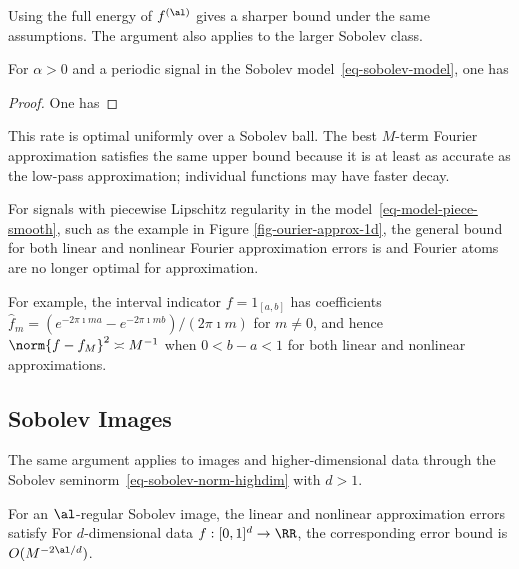 Using the full energy of $f^{(\al)}$ gives a sharper bound under the same assumptions. The argument also applies to the larger Sobolev class.

\begin{prop}\label{prop-sobol-fourier-lin}
	For $\alpha>0$ and a periodic signal in the Sobolev model~\eqref{eq-sobolev-model}, one has
\end{prop}
\begin{proof}
	One has
\end{proof}

This rate is optimal uniformly over a Sobolev ball. The best $M$-term Fourier approximation satisfies the same upper bound because it is at least as accurate as the low-pass approximation; individual functions may have faster decay.

For signals with piecewise Lipschitz regularity in the model~\eqref{eq-model-piece-smooth}, such as the example in Figure \ref{fig-ourier-approx-1d}, the general bound for both linear and nonlinear Fourier approximation errors is
and Fourier atoms are no longer optimal for approximation.
 
For example, the interval indicator $f=1_{[a,b]}$ has coefficients $\hat f_m=(e^{-2\pi\imath ma}-e^{-2\pi\imath mb})/(2\pi\imath m)$ for $m\neq0$, and hence
$\norm{f-f_M}^2\asymp M^{-1}$ when $0<b-a<1$ for both linear and nonlinear approximations.

                                        
\subsection{Sobolev Images}

The same argument applies to images and higher-dimensional data through the Sobolev seminorm~\eqref{eq-sobolev-norm-highdim} with $d>1$.

For an $\al$-regular Sobolev image, the linear and nonlinear approximation errors satisfy
For $d$-dimensional data $f : [0,1]^d \rightarrow \RR$, the corresponding error bound is $O(M^{-2\al/d})$.

